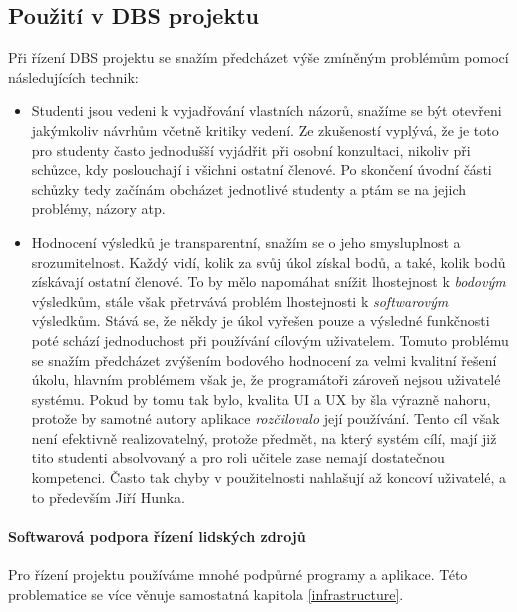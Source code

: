 \subsection{Použití v DBS projektu} \label{DBSmanagement:meeting}
Při řízení DBS projektu se snažím předcházet výše zmíněným problémům pomocí následujících technik:
\begin{itemize}
	\item Studenti jsou vedeni k vyjadřování vlastních názorů, snažíme se být otevřeni jakýmkoliv návrhům včetně kritiky vedení. Ze zkušeností vyplývá, že je toto pro studenty často jednodušší vyjádřit při osobní konzultaci, nikoliv při schůzce, kdy poslouchají i všichni ostatní členové. Po skončení úvodní  části schůzky tedy začínám obcházet jednotlivé studenty a ptám se na jejich problémy, názory atp.
	\item Hodnocení výsledků je transparentní, snažím se o jeho smysluplnost a srozumitelnost. Každý vidí, kolik za svůj úkol získal bodů, a také, kolik bodů získávají ostatní členové. To by mělo napomáhat snížit lhostejnost k \emph{bodovým} výsledkům, stále však přetrvává problém lhostejnosti k \emph{softwarovým} výsledkům. Stává se, že někdy je úkol vyřešen pouze  a výsledné funkčnosti poté schází jednoduchost při používání cílovým uživatelem. Tomuto problému se snažím předcházet zvýšením bodového hodnocení za velmi kvalitní řešení úkolu, hlavním problémem však je, že programátoři zároveň nejsou uživatelé systému. Pokud by tomu tak bylo, kvalita UI a UX by šla výrazně nahoru, protože by samotné autory aplikace \emph{rozčilovalo} její používání. Tento cíl však není efektivně realizovatelný, protože předmět, na který systém cílí, mají již tito studenti absolvovaný a pro roli učitele zase nemají dostatečnou kompetenci. Často tak chyby v použitelnosti nahlašují až koncoví uživatelé, a to především Jiří Hunka.
\end{itemize}



\paragraph{Softwarová podpora řízení lidských zdrojů}

Pro řízení projektu používáme mnohé podpůrné programy a aplikace. Této problematice se více věnuje samostatná kapitola \ref{infrastructure}.
